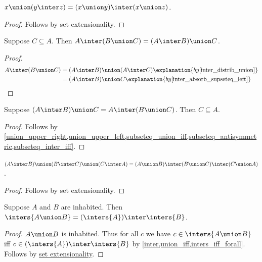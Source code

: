 \begin{proposition}%
\label{union_distrib_inter}
    $x\union (y\inter z) = (x\union y)\inter (x\union z)$.
\end{proposition}
\begin{proof}
    Follows by set extensionality.
\end{proof}

\begin{proposition}\label{union_inter_assoc_intro}
    Suppose $C\subseteq A$.
    Then $A\inter (B\union C) = (A\inter B)\union C$.
\end{proposition}
\begin{proof}
    \begin{align*}
        A\inter (B\union C) &= (A\inter B)\union (A\inter C) \explanation{by \cref{inter_distrib_union}}\\
        &= (A\inter B)\union C \explanation{by \cref{inter_absorb_supseteq_left}}
    \end{align*}
\end{proof}

\begin{proposition}\label{union_inter_assoc_elim}
    Suppose $(A\inter B)\union C = A\inter (B\union C)$.
    Then $C\subseteq A$.
\end{proposition}
\begin{proof}
    Follows by \cref{union_upper_right,union_upper_left,subseteq_union_iff,subseteq_antisymmetric,subseteq_inter_iff}.
\end{proof}

\begin{proposition}\label{union_inter_crazy}
    $(A\inter B)\union (B\inter C)\union (C\inter A)
    =
    (A\union B)\inter (B\union C)\inter (C\union A)$.
\end{proposition}
\begin{proof}
    Follows by set extensionality.
\end{proof}


\begin{proposition}\label{inters_distrib_union}
    Suppose $A$ and $B$ are inhabited.
    Then $\inters{A\union B} = (\inters{A})\inter\inters{B}$.
\end{proposition}
\begin{proof}
    $A\union B$ is inhabited.
    Thus for all $c$ we have $c\in\inters{A\union B}$ iff $c\in(\inters{A})\inter\inters{B}$
        by \cref{inter,union_iff,inters_iff_forall}.
    Follows by \hyperref[setext]{set extensionality}. %
\end{proof}

